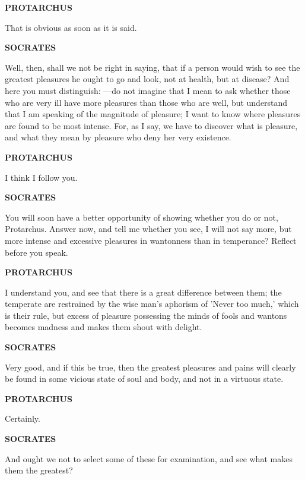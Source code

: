 \documentclass[11pt,letter]{article}
\begin{document}
\par \textbf{PROTARCHUS}
\par   That is obvious as soon as it is said.

\par \textbf{SOCRATES}
\par   Well, then, shall we not be right in saying, that if a person would wish to see the greatest pleasures he ought to go and look, not at health, but at disease? And here you must distinguish: —do not imagine that I mean to ask whether those who are very ill have more pleasures than those who are well, but understand that I am speaking of the magnitude of pleasure; I want to know where pleasures are found to be most intense. For, as I say, we have to discover what is pleasure, and what they mean by pleasure who deny her very existence.

\par \textbf{PROTARCHUS}
\par   I think I follow you.

\par \textbf{SOCRATES}
\par   You will soon have a better opportunity of showing whether you do or not, Protarchus. Answer now, and tell me whether you see, I will not say more, but more intense and excessive pleasures in wantonness than in temperance? Reflect before you speak.

\par \textbf{PROTARCHUS}
\par   I understand you, and see that there is a great difference between them; the temperate are restrained by the wise man's aphorism of 'Never too much,' which is their rule, but excess of pleasure possessing the minds of fools and wantons becomes madness and makes them shout with delight.

\par \textbf{SOCRATES}
\par   Very good, and if this be true, then the greatest pleasures and pains will clearly be found in some vicious state of soul and body, and not in a virtuous state.

\par \textbf{PROTARCHUS}
\par   Certainly.

\par \textbf{SOCRATES}
\par   And ought we not to select some of these for examination, and see what makes them the greatest?
\end{document}
